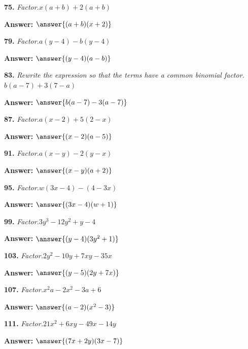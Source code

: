 \documentclass{ximera}
\begin{document}
\begin{problem}
\textbf{75.} \emph{Factor.}\quad $x(a + b) + 2(a + b)$

\textbf{Answer:} $\answer{(a +b)(x +2)}$
\end{problem}

\begin{problem}
\textbf{79.} \emph{Factor.}\quad $a(y - 4) - b(y - 4)$

\textbf{Answer:} $\answer{(y -4)(a -b)}$
\end{problem}

\begin{problem}
\textbf{83.} \emph{Rewrite the expression so that the terms have a common binomial factor.}\quad $b(a - 7) + 3(7 - a)$

\textbf{Answer:} $\answer{b(a -7) -3(a -7)}$
\end{problem}

\begin{problem}
\textbf{87.} \emph{Factor.}\quad $a(x - 2) + 5(2 - x)$

\textbf{Answer:} $\answer{(x -2)(a -5)}$
\end{problem}

\begin{problem}
\textbf{91.} \emph{Factor.}\quad $a(x - y) - 2(y - x)$

\textbf{Answer:} $\answer{(x -y)(a +2)}$
\end{problem}

\begin{problem}
\textbf{95.} \emph{Factor.}\quad $w(3x - 4) - (4 - 3x)$

\textbf{Answer:} $\answer{(3x -4)(w +1)}$
\end{problem}

\begin{problem}
\textbf{99.} \emph{Factor.}\quad $3y^3 - 12y^2 + y - 4$

\textbf{Answer:} $\answer{(y -4)(3y^2 +1)}$
\end{problem}

\begin{problem}
\textbf{103.} \emph{Factor.}\quad $2y^2 - 10y + 7xy - 35x$

\textbf{Answer:} $\answer{(y -5)(2y +7x)}$
\end{problem}

\begin{problem}
\textbf{107.} \emph{Factor.}\quad $x^2a - 2x^2 - 3a + 6$

\textbf{Answer:} $\answer{(a -2)(x^2 -3)}$
\end{problem}

\begin{problem}
\textbf{111.} \emph{Factor.}\quad $21x^2 + 6xy - 49x - 14y$

\textbf{Answer:} $\answer{(7x +2y)(3x -7)}$
\end{problem}
\end{document}
